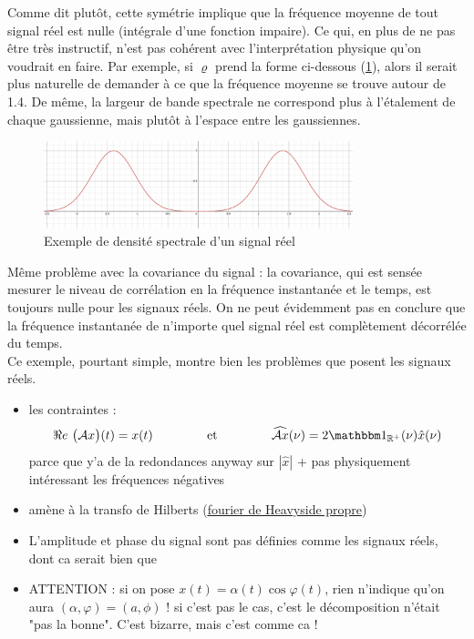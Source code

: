 Comme dit plutôt, cette symétrie implique que la fréquence moyenne de tout signal réel est nulle (intégrale d'une fonction impaire). Ce qui, en plus de ne pas être très instructif, n'est pas cohérent avec l'interprétation physique qu'on voudrait en faire. Par exemple, si $\varrho$ prend la forme ci-dessous (\cref{fig:densi_spec_sym}), alors il serait plus naturelle de demander à ce que la fréquence moyenne se trouve autour de 1.4. De même, la largeur de bande spectrale ne correspond plus à l'étalement de chaque gaussienne, mais plutôt à l'espace entre les gaussiennes.
\begin{figure}[h]\centering
	\includegraphics[width=0.8\textwidth]{fig/densi_spec_sym}
	\caption{Exemple de densité spectrale d'un signal réel}
	\label{fig:densi_spec_sym}
\end{figure}

Même problème avec la covariance du signal : la covariance, qui est sensée mesurer le niveau de corrélation en la fréquence instantanée et le temps, est toujours nulle pour les signaux réels. On ne peut évidemment pas en conclure que la fréquence instantanée de n'importe quel signal réel est complètement décorrélée du temps.
\\

Ce exemple, pourtant simple, montre bien les problèmes que posent les signaux réels. 

\begin{itemize}
	
	\item les contraintes : 
	\begin{equation}
		\Re e\ \big(\mathcal{A}x\big)(t) = x(t)  \qquad\qquad\text{ et } \qquad\qquad  \widehat{\mathcal{A}x}(\nu) = 2\one_{\R^+}(\nu)\hat{x}(\nu)
	\end{equation} 
	parce que y'a de la redondances anyway sur $|\hat{x}|$ + pas physiquement intéressant les fréquences négatives
	
	\item amène à la transfo de Hilberts (\href{https://les-mathematiques.net/vanilla/discussion/859485/transformee-de-fourier-de-heaviside}{\color{blue}\underline{fourier de Heavyside propre}})
	
	\item L'amplitude et phase du signal sont pas définies comme les signaux réels, dont ca serait bien que 
	
	\item ATTENTION : si on pose $x(t)=\alpha(t)\cos\varphi(t)$, rien n'indique qu'on aura $(\alpha,\varphi) = (a,\phi)$ ! si c'est pas le cas, c'est le décomposition n'était "pas la bonne". C'est bizarre, mais c'est comme ca !
\end{itemize}



